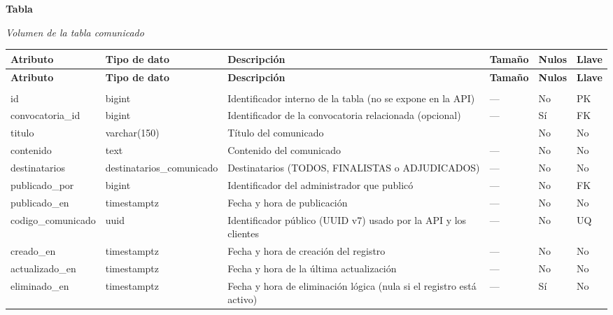 \label{tab:volumen_comunicado}
\noindent\textbf{Tabla~\thetable}\par\nopagebreak
\noindent\textit{Volumen de la tabla comunicado}\par\nopagebreak
\begingroup\small\linespread{1}\selectfont\setlength{\tabcolsep}{4pt}
\begin{longtable}{>{\raggedright\arraybackslash}p{3.4cm} >{\raggedright\arraybackslash}p{2.5cm} >{\raggedright\arraybackslash}p{4.8cm} >{\centering\arraybackslash}p{1.6cm}>{\centering\arraybackslash}p{1.1cm} >{\centering\arraybackslash}p{1.3cm}}
\toprule
\textbf{Atributo} & \textbf{Tipo de dato} & \textbf{Descripción} & \textbf{Tamaño} & \textbf{Nulos} & \textbf{Llave} \\
\midrule
\endfirsthead
\toprule
\textbf{Atributo} & \textbf{Tipo de dato} & \textbf{Descripción} & \textbf{Tamaño} & \textbf{Nulos} & \textbf{Llave} \\
\midrule
\endhead
\endfoot
\bottomrule
\multicolumn{6}{l}{\textit{Nota.} Elaboración propia.} \\
\endlastfoot
id & bigint & Identificador interno de la tabla (no se expone en la API) & — & No & PK \\
convocatoria\_\allowbreak{}id & bigint & Identificador de la convocatoria relacionada (opcional) & — & Sí & FK \\
titulo & varchar(150) & Título del comunicado & 150 & No & No \\
contenido & text & Contenido del comunicado & — & No & No \\
destinatarios & destinatarios\_\allowbreak{}comunicado & Destinatarios (TODOS, FINALISTAS o ADJUDICADOS) & — & No & No \\
publicado\_\allowbreak{}por & bigint & Identificador del administrador que publicó & — & No & FK \\
publicado\_\allowbreak{}en & timestamptz & Fecha y hora de publicación & — & No & No \\
codigo\_\allowbreak{}comunicado & uuid & Identificador público (UUID v7) usado por la API y los clientes & — & No & UQ \\
creado\_\allowbreak{}en & timestamptz & Fecha y hora de creación del registro & — & No & No \\
actualizado\_\allowbreak{}en & timestamptz & Fecha y hora de la última actualización & — & No & No \\
eliminado\_\allowbreak{}en & timestamptz & Fecha y hora de eliminación lógica (nula si el registro está activo) & — & Sí & No \\
\end{longtable}
\endgroup
\addtocounter{table}{-1}

